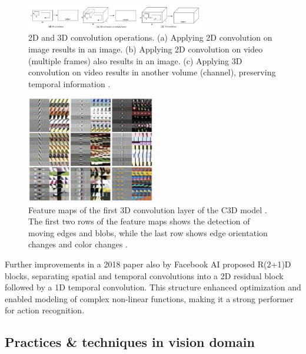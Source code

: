 \begin{figure}
    \centering
    \includegraphics[width=0.7\textwidth]{images/video_synthesis/conv.png}
    \caption{2D and 3D convolution operations. (a) Applying 2D convolution on image results in an image. (b) Applying 2D convolution on video (multiple frames) also results in an image. (c) Applying 3D convolution on video results in another volume (channel), preserving temporal information \cite{tran2015learning}.}
\end{figure}

\begin{figure}
    \centering
    \includegraphics[width=0.5\textwidth]{images/video_synthesis/c3d_feature_maps.png}
    \caption{Feature maps of the first 3D convolution layer of the C3D model \cite{tran2015learning}. The first two rows of the feature maps shows the detection of moving edges and blobs, while the last row shows edge orientation changes and color changes \cite{tran2015learning}.}
    \label{fig:c3d_feature_maps}
\end{figure}

Further improvements in a 2018 paper \cite{tran2018closer} also by Facebook AI proposed R(2+1)D blocks, separating spatial and temporal convolutions into a 2D residual block followed by a 1D temporal convolution. This structure enhanced optimization and enabled modeling of complex non-linear functions, making it a strong performer for action recognition.














\subsection{Practices \& techniques in vision domain}


